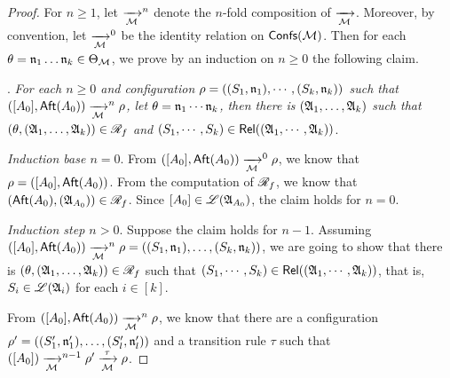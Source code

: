 
\begin{proof}
For $n \ge 1$, let $\xrightarrow[{\mathcal{M} }]{}^n$ denote the $n$-fold composition of $\xrightarrow[{\mathcal{M} }]{}$. Moreover, by convention, let $\xrightarrow[{\mathcal{M} }]{}^0$ be the identity relation on ${\mathsf{Confs} }({\mathcal{M} })$. 
Then for each $\theta = \mathfrak{n}_1 \dots \mathfrak{n}_k \in \Theta_{\mathcal{M} }$, we prove by an induction on $n \ge 0$ the following claim.

\smallskip

. \emph{For each $n \ge 0$ and configuration $\rho =  ((S_1, \mathfrak{n}_1), \cdots, (S_k, \mathfrak{n}_k))$ such that 
%
$([A_0], {\sf Aft}(A_0)) \xrightarrow[{\mathcal{M} }]{}^n \rho$,  let $\theta  = \mathfrak{n}_1 \cdots \mathfrak{n}_k$, then 
%
there is  $({\mathfrak{A} }_1, \dots, {\mathfrak{A} }_k)$ such that $(\theta, ({\mathfrak{A} }_1, \dots, {\mathfrak{A} }_k)) \in \mathscr{R}_f$ and $(S_1, \cdots, S_k) \in \mathsf{Rel}(({\mathfrak{A} }_1,\cdots, {\mathfrak{A} }_k))$}.   


\smallskip

\noindent \emph{Induction base $n = 0$}. From $([A_0], {\sf Aft}(A_0)) \xrightarrow[{\mathcal{M} }]{}^0 \rho$, we know that $\rho = ([A_0], {\sf Aft}(A_0))$. From the computation of $\mathscr{R}_f$, we know that $({\sf Aft}(A_0), ({\mathfrak{A} }_{A_0})) \in \mathscr{R}_f$. Since $[A_0] \in {\mathscr{L} }({\mathfrak{A} }_{A_0})$, the claim holds for $n = 0$. 

\smallskip

\noindent \emph{Induction step $n > 0$}. Suppose the claim holds for $n-1$. Assuming $([A_0], {\sf Aft}(A_0)) \xrightarrow[{\mathcal{M} }]{}^n \rho =  ((S_1, \mathfrak{n}_1), \dots, (S_k, \mathfrak{n}_k))$, we are going to show that there is  $(\theta, ({\mathfrak{A} }_1, \dots, {\mathfrak{A} }_k)) \in \mathscr{R}_f$ such that $(S_1, \cdots, S_k) \in \mathsf{Rel}(({\mathfrak{A} }_1,\cdots, {\mathfrak{A} }_k))$, that is, $S_i \in {\mathscr{L} }({\mathfrak{A} }_i)$ for each $i \in [k]$. 

From $([A_0], {\sf Aft}(A_0)) \xrightarrow[{\mathcal{M} }]{}^n \rho$,  we know that there are a configuration $\rho' = ((S'_1, \mathfrak{n}'_1), \dots, (S'_l, \mathfrak{n}'_l))$ and a transition rule $\tau$ such that $([A_0]) \xrightarrow[{\mathcal{M} }]{}^{n-1} \rho' \xrightarrow[{\mathcal{M} }]{\tau} \rho$.


\end{proof}
